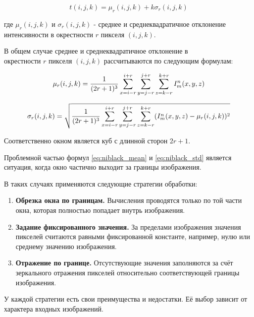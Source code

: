 \begin{equation} \label{eq:niblack}
    t(i, j, k) = \mu_r(i, j, k) + k \sigma_r(i, j, k)
\end{equation}

где \(\mu_r(i, j, k)\) и \(\sigma_r(i, j, k)\) - среднее и среднеквадратичное отклонение интенсивности в окрестности \(r\) пикселя \((i, j, k)\).

В общем случае среднее и среднеквадратичное отклонение в \\ окрестности \(r\) пикселя \((i, j, k)\) рассчитываются по следующим формулам:

\begin{equation}\label{eq:niblack_mean}
    \mu_r(i, j, k) = \frac{1}{(2r + 1)^3} \sum_{x = i - r}^{i + r} \sum_{y = j - r}^{j + r} \sum_{z = k - r}^{k + r} I^n_m(x, y, z)
\end{equation}

\begin{equation}\label{eq:niblack_std}
    \sigma_r(i, j, k) = \sqrt{\frac{1}{(2r + 1)^3} \sum_{x = i - r}^{i + r} \sum_{y = j - r}^{j + r} \sum_{z = k - r}^{k + r} (I^n_m(x, y, z) - \mu_r(i, j, k))^2}
\end{equation}

Соответственно окном является куб с длинной сторон \(2r + 1\). 

Проблемной частью формул \ref{eq:niblack_mean} и \ref{eq:niblack_std} является ситуация, когда окно частично выходит за границы изображения.

В таких случаях применяются следующие стратегии обработки:

\begin{enumerate}
    \item \textbf{Обрезка окна по границам.} Вычисления проводятся только по той части окна, которая полностью попадает внутрь изображения.
    
    \item \textbf{Задание фиксированного значения.} За пределами изображения значения пикселей считаются равными фиксированной константе, например, нулю или среднему значению изображения.
    
    \item \textbf{Отражение по границе.} Отсутствующие значения заполняются за счёт зеркального отражения пикселей относительно соответствующей границы изображения.
\end{enumerate}

У каждой стратегии есть свои преимущества и недостатки. Её выбор зависит от характера входных изображений.

